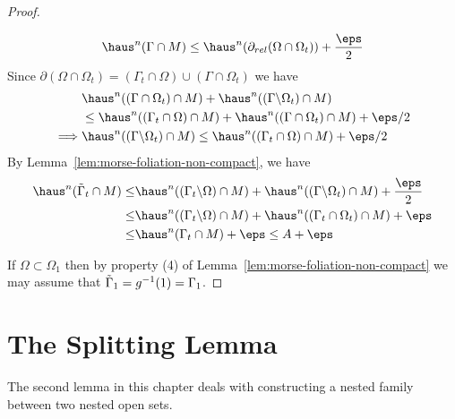\begin{lemma}
\begin{proof}
\begin{itemize}
\begin{equation*}
                \haus^n(\Gamma\cap M) \leq \haus^n(\partial_{rel}(\Omega\cap\Omega_t)) + \frac{\eps}{2}
            \end{equation*}
            Since $\partial(\Omega\cap \Omega_t) = (\Gamma_t\cap\Omega)\cup(\Gamma\cap\Omega_t)$ we have
            \begin{equation*}
                \begin{split}
                    &\haus^n((\Gamma\cap\Omega_t)\cap M) + \haus^n((\Gamma\backslash\Omega_t)\cap M) \\
                    &\leq \haus^n((\Gamma_t\cap\Omega)\cap M) + \haus^n((\Gamma\cap\Omega_t)\cap M) + \eps/2\\
                    \implies & \haus^n((\Gamma\backslash\Omega_t)\cap M) \leq \haus^n((\Gamma_t\cap\Omega)\cap M) + \eps/2
                \end{split}
            \end{equation*}
            By Lemma~\ref{lem:morse-foliation-non-compact}, we have
        \begin{equation*}
            \begin{split}
                \haus^n(\Tilde{\Gamma}_t\cap M) \leq& \haus^n((\Gamma_t\backslash \Omega)\cap M) + \haus^n((\Gamma\backslash\Omega_t)\cap M) + \frac{\eps}{2}\\
                \leq& \haus^n((\Gamma_t\backslash \Omega)\cap M) + \haus^n((\Gamma_t\cap\Omega_t)\cap M) + \eps\\
                \leq& \haus^n(\Gamma_t\cap M) + \eps \leq A + \eps
            \end{split}
        \end{equation*}
        \end{itemize}
        If $\Omega \subset \Omega_1$ then by property (4) of Lemma~\ref{lem:morse-foliation-non-compact} we may assume that $\Tilde{\Gamma}_1 = g^{-1}(1) = \Gamma_1$.
    \end{proof}
\end{lemma}

\section{The Splitting Lemma}\label{sec:splitting-lemma}

The second lemma in this chapter deals with constructing a nested family between two nested open sets.

